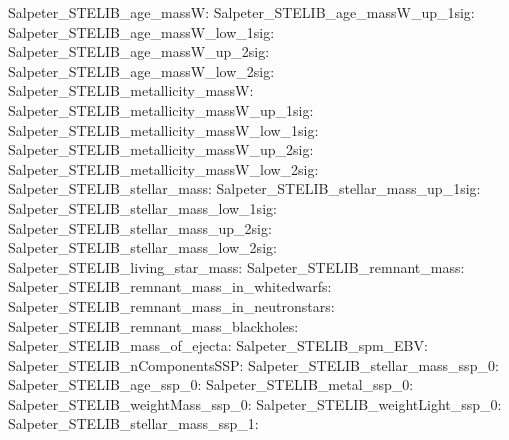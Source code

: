 Salpeter\_STELIB\_age\_massW:  \newline 
Salpeter\_STELIB\_age\_massW\_up\_1sig:  \newline 
Salpeter\_STELIB\_age\_massW\_low\_1sig:  \newline 
Salpeter\_STELIB\_age\_massW\_up\_2sig:  \newline 
Salpeter\_STELIB\_age\_massW\_low\_2sig:  \newline 
Salpeter\_STELIB\_metallicity\_massW:  \newline 
Salpeter\_STELIB\_metallicity\_massW\_up\_1sig:  \newline 
Salpeter\_STELIB\_metallicity\_massW\_low\_1sig:  \newline 
Salpeter\_STELIB\_metallicity\_massW\_up\_2sig:  \newline 
Salpeter\_STELIB\_metallicity\_massW\_low\_2sig:  \newline 
Salpeter\_STELIB\_stellar\_mass:  \newline 
Salpeter\_STELIB\_stellar\_mass\_up\_1sig:  \newline 
Salpeter\_STELIB\_stellar\_mass\_low\_1sig:  \newline 
Salpeter\_STELIB\_stellar\_mass\_up\_2sig:  \newline 
Salpeter\_STELIB\_stellar\_mass\_low\_2sig:  \newline 
Salpeter\_STELIB\_living\_star\_mass:  \newline 
Salpeter\_STELIB\_remnant\_mass:  \newline 
Salpeter\_STELIB\_remnant\_mass\_in\_whitedwarfs:  \newline 
Salpeter\_STELIB\_remnant\_mass\_in\_neutronstars:  \newline 
Salpeter\_STELIB\_remnant\_mass\_blackholes:  \newline 
Salpeter\_STELIB\_mass\_of\_ejecta:  \newline 
Salpeter\_STELIB\_spm\_EBV:  \newline 
Salpeter\_STELIB\_nComponentsSSP:  \newline 
Salpeter\_STELIB\_stellar\_mass\_ssp\_0:  \newline 
Salpeter\_STELIB\_age\_ssp\_0:  \newline 
Salpeter\_STELIB\_metal\_ssp\_0:  \newline 
Salpeter\_STELIB\_weightMass\_ssp\_0:  \newline 
Salpeter\_STELIB\_weightLight\_ssp\_0:  \newline 
Salpeter\_STELIB\_stellar\_mass\_ssp\_1:  \newline 
